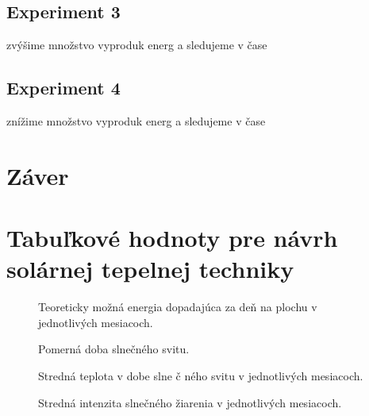 \documentclass[a4paper, 11pt]{article}
\begin{document}
\subsection{Experiment 3}
zvýšime množstvo vyproduk energ a sledujeme v čase

\subsection{Experiment 4}
znížime množstvo vyproduk energ a sledujeme v čase

\section{Záver}

\newpage



\newpage
\appendix

\section{Tabuľkové hodnoty pre návrh solárnej tepelnej techniky}\label{tabulky}
\begin{figure}[H] 
\centering
\caption{Teoreticky možná energia dopadajúca za deň na plochu v jednotlivých mesiacoch.}
\label{str34}
\end{figure}

\begin{figure}[H] 
\centering
\caption{Pomerná doba slnečného svitu.}
\label{str41}
\end{figure}

\begin{figure}[H] 
\centering
\caption{Stredná teplota v dobe slne č ného svitu v jednotlivých mesiacoch.}
\label{str50}
\end{figure}

\begin{figure}[H] 
\centering
\caption{Stredná intenzita slnečného žiarenia v jednotlivých mesiacoch.}
\label{str51}
\end{figure}
\end{document}
